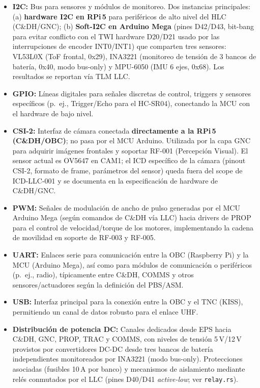 \begin{itemize}
    \item \textbf{I2C:} Bus para sensores y módulos de monitoreo. Dos instancias principales: (a) \textbf{hardware I2C en RPi\,5} para periféricos de alto nivel del HLC (C\&DH/GNC); (b) \textbf{Soft-I2C en Arduino Mega} (pines D42/D43, bit-bang para evitar conflicto con el TWI hardware D20/D21 usado por las interrupciones de encoder INT0/INT1) que comparten tres sensores: VL53L0X (ToF frontal, 0x29), INA3221 (monitoreo de tensión de 3 bancos de batería, 0x40, modo bus-only) y MPU-6050 (IMU 6 ejes, 0x68). Los resultados se reportan vía TLM LLC.
    \item \textbf{GPIO:} Líneas digitales para señales discretas de control, triggers y sensores específicos (p.\ ej., Trigger/Echo para el HC-SR04), conectando la MCU con el hardware de bajo nivel.
    \item \textbf{CSI-2:} Interfaz de cámara conectada \textbf{directamente a la RPi\,5 (C\&DH/OBC)}; no pasa por el MCU Arduino. Utilizada por la capa GNC para adquirir imágenes frontales y soportar RF-001 (Percepción Visual). El sensor actual es OV5647 en CAM1; el ICD específico de la cámara (pinout CSI-2, formato de frame, parámetros del sensor) queda fuera del scope de ICD-LLC-001 y se documenta en la especificación de hardware de C\&DH/GNC.
    \item \textbf{PWM:} Señales de modulación de ancho de pulso generadas por el MCU Arduino Mega (según comandos de C\&DH vía LLC) hacia drivers de PROP para el control de velocidad/torque de los motores, implementando la cadena de movilidad en soporte de RF‑003 y RF‑005.
    \item \textbf{UART:} Enlaces serie para comunicación entre la OBC (Raspberry Pi) y la MCU (Arduino Mega), así como para módulos de comunicación o periféricos (p.\ ej., radio), típicamente entre C\&DH, COMMS y otros sensores/actuadores según la definición del PBS/ASM.
    \item \textbf{USB:} Interfaz principal para la conexión entre la OBC y el TNC (KISS), permitiendo un canal de datos robusto para el enlace UHF.
    \item \textbf{Distribución de potencia DC:} Canales dedicados desde EPS hacia C\&DH, GNC, PROP, TRAC y COMMS, con niveles de tensión 5\,V/12\,V provistos por convertidores DC-DC desde tres bancos de batería independientes monitoreados por INA3221 (modo bus-only). Protecciones asociadas (fusibles 10\,A por banco) y mecanismos de aislamiento mediante relés conmutados por el LLC (pines D40/D41 \emph{active-low}; ver \texttt{relay.rs}).
\end{itemize}

